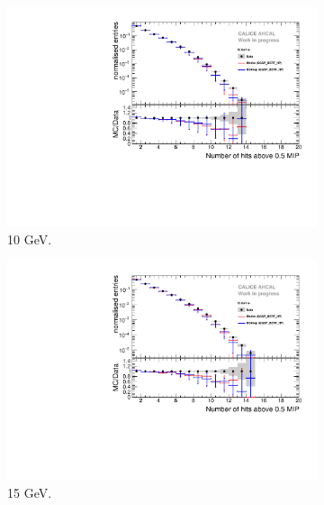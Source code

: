 \begin{figure}[htbp!]
	\begin{subfigure}[t]{0.5\textwidth}
		\centering
		\includegraphics[width=1\textwidth]{../Thesis_Plots/Timing/Electrons/Plots/Comparison_SimData_Electrons_nHits_10GeV.pdf}
		\caption{10 GeV.}\label{fig:elec_sim_data_nHits_10GeV}
	\end{subfigure}
	\hfill
	\begin{subfigure}[t]{0.5\textwidth}
		\centering
		\includegraphics[width=1\textwidth]{../Thesis_Plots/Timing/Electrons/Plots/Comparison_SimData_Electrons_nHits_15GeV.pdf}
		\caption{15 GeV.}\label{fig:elec_sim_data_nHits_15GeV}
	\end{subfigure}
	\hfill
	\begin{subfigure}[t]{0.5\textwidth}
		\centering

\end{subfigure}
\end{figure}
